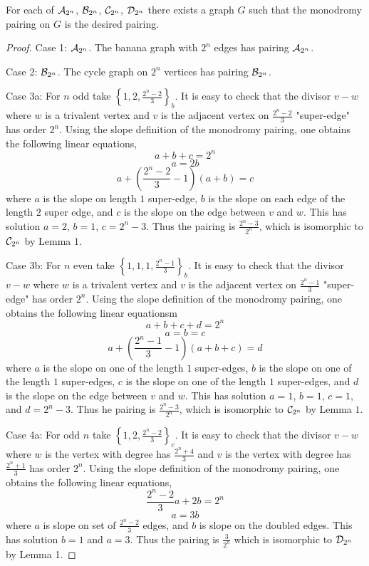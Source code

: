 \documentclass{amsart}
\begin{document}
 \begin{thm} For each of $\mathcal{A}_{2^{n}}$, $\mathcal{B}_{2^{n}}$, $\mathcal{C}_{2^{n}}$, $\mathcal{D}_{2^{n}}$ there exists a
graph $G$ such that the monodromy pairing on $G$ is the desired
pairing.
 \end{thm}
 \begin{proof}
  
   Case 1: $\mathcal{A}_{2^{n}}$. The banana graph with $2^{n}$ edges has pairing
$\mathcal{A}_{2^{n}}$.
  
   Case 2: $\mathcal{B}_{2^{n}}$. The cycle graph on $2^{n}$ vertices has pairing
$\mathcal{B}_{2^{n}}$.
  
   Case 3a: For $n$ odd take $\left\{1, 2,
\frac{2^{n}-2}{3}\right\}_{b}$. It is easy to check that the divisor
$v-w$ where $w$ is a trivalent vertex and $v$ is the adjacent vertex
on $\frac{2^{n}-2}{3}$ "super-edge" has order $2^{n}$. Using the slope
definition of the monodromy pairing, one obtains the following linear
equations,
    \[ a+b+c=2^{n}
    \]
    \[ a=2b
    \]
    \[ a+\left(\frac{2^{n}-2}{3}-1\right)(a+b)=c
    \] where $a$ is the slope on length $1$ super-edge, $b$ is the
slope on each edge of the length $2$ super edge, and $c$ is the slope
on the edge between $v$ and $w$. This has solution $a=2$, $b=1$,
$c=2^{n}-3$. Thus the pairing is $\frac{2^{n}-3}{2^{n}}$, which is
isomorphic to $\mathcal{C}_{2^{n}}$ by Lemma $1$.
    
    Case 3b: For $n$ even take $\left\{1,1,1,
\frac{2^{n}-1}{3}\right\}_{b}$. It is easy to check that the divisor
$v-w$ where $w$ is a trivalent vertex and $v$ is the adjacent vertex
on $\frac{2^{n}-1}{3}$ "super-edge" has order $2^{n}$. Using the slope
definition of the monodromy pairing, one obtains the following linear
equationsm
     \[ a+b+c+d=2^{n}
     \]
     \[ a=b=c
     \]
     \[ a+\left(\frac{2^{n}-1}{3}-1 \right)(a+b+c)=d
     \] where $a$ is the slope on one of the length $1$ super-edges,
$b$ is the slope on one of the length $1$ super-edges, $c$ is the
slope on one of the length $1$ super-edges, and $d$ is the slope on
the edge between $v$ and $w$. This has solution $a=1$, $b=1$, $c=1$,
and $d=2^{n}-3$. Thus he pairing is $\frac{2^{n}-3}{2^{n}}$, which is
isomorphic to $\mathcal{C}_{2^{n}}$ by Lemma $1$.
    
    Case 4a: For odd $n$ take $\left\{1, 2,
\frac{2^{n}-2}{3}\right\}_{c}$. It is easy to check that the divisor
$v-w$ where $w$ is the vertex with degree has $\frac{2^{n}+4}{3}$ and
$v$ is the vertex with degree has $\frac{2^{n}+1}{3}$ has order
$2^{n}$. Using the slope definition of the monodromy pairing, one
obtains the following linear equations,
     \[ \frac{2^{n}-2}{3}a+2b=2^{n}
     \]
     \[ a=3b
     \] where $a$ is slope on set of $\frac{2^{n}-2}{3}$ edges, and
$b$ is slope on the doubled edges. This has solution $b=1$ and
$a=3$. Thus the pairing is $\frac{3}{2^{n}}$ which is isomorphic to
$\mathcal{D}_{2^{n}}$ by Lemma 1.
    

\end{proof}
\end{document}
